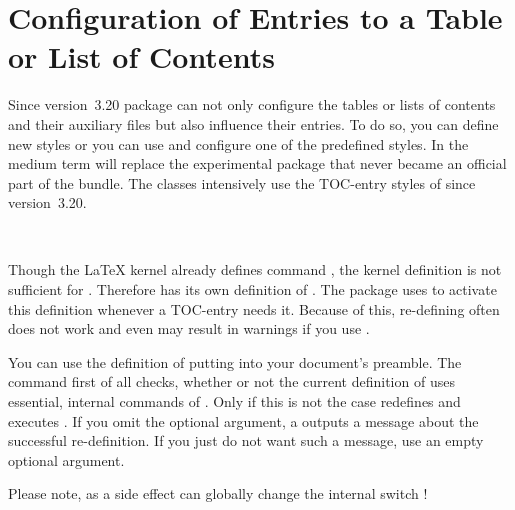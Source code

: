 \section{Configuration of Entries to a Table or List of Contents}
%
%

Since version~3.20 package
 can not only configure the tables or lists of contents and
their auxiliary files but also influence their entries. To do so, you can
define new styles or you can use and configure one of the predefined
styles. In the medium term  will replace the experimental
package  that never became an official part of the
\KOMAScript{} bundle. The \KOMAScript{} classes intensively use the TOC-entry
styles of  since version~3.20.

\begin{Declaration}
  \\
\end{Declaration}
%
%
Though the \LaTeX{} kernel
already defines command , the kernel definition is not
sufficient for . Therefore  has its own
definition of . The package uses
 to activate this definition whenever a TOC-entry
needs it. Because of this, re-defining  often does not work
and even may result in warnings if you use .

You can use the definition of  putting
 into your document's preamble. The command first
of all checks, whether or not the current definition of 
uses essential, internal commands of . Only if this is not
the case  redefines  and
executes . If you omit the optional argument, a
 outputs a message about the successful re-definition. If
you just do not want such a message, use an empty optional argument.

Please note, as a side effect
 can globally change the internal switch
!%
%
%


